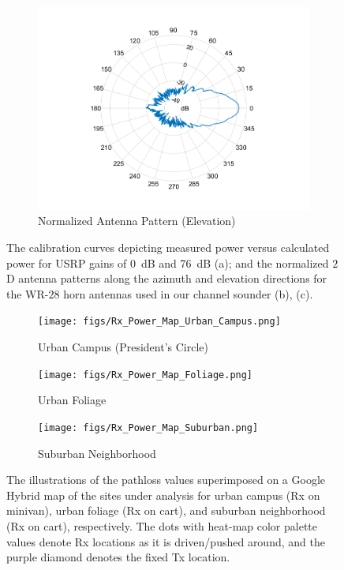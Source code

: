 \documentclass[10pt, twocolumn]{IEEEtran}
\begin{document}
\begin{figure} [t]
     \begin{subfigure}{0.333\linewidth}
         \centering
         \includegraphics[width=1.0\linewidth]{figs/Antenna_Pattern_Normalized_2D_Elevation.png}
         \caption{Normalized Antenna Pattern (Elevation)}
         \label{F3c}
     \end{subfigure}
     \vspace{-2mm}
     \caption{The calibration curves depicting measured power versus calculated power for USRP gains of \SI{0}{\deci\bel} and \SI{76}{\deci\bel} (a); and the normalized $2$D antenna patterns along the azimuth and elevation directions for the WR-$28$ horn antennas used in our channel sounder (b), (c).}
     \label{F3}
     \vspace{-4mm}
\end{figure}
\begin{figure} [t]
     \begin{subfigure}{0.333\linewidth}
         \centering
         \texttt{[image: figs/Rx\_Power\_Map\_Urban\_Campus.png]}
         \caption{Urban Campus (President's Circle)}
         \label{F4a}
     \end{subfigure}
     \begin{subfigure}{0.333\linewidth}
         \centering
         \texttt{[image: figs/Rx\_Power\_Map\_Foliage.png]}
         \caption{Urban Foliage}
         \label{F4b}
     \end{subfigure}
     \begin{subfigure}{0.333\linewidth}
         \centering
         \texttt{[image: figs/Rx\_Power\_Map\_Suburban.png]}
         \caption{Suburban Neighborhood}
         \label{F4c}
     \end{subfigure}
     \vspace{-2mm}
     \caption{The illustrations of the pathloss values superimposed on a Google Hybrid map of the sites under analysis for urban campus (Rx on minivan), urban foliage (Rx on cart), and suburban neighborhood (Rx on cart), respectively. The dots with heat-map color palette values denote Rx locations as it is driven/pushed around, and the purple diamond denotes the fixed Tx location.}
     \label{F4}
     \vspace{-6mm}
\end{figure}
\end{document}
